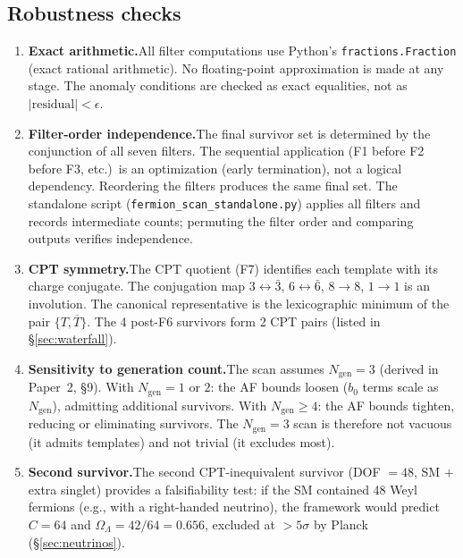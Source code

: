 \documentclass[11pt,a4paper]{article}
\theoremstyle{definition}
\begin{document}
\subsection{Robustness checks}
\label{app:robustness}

\begin{enumerate}[nosep]
\item \textbf{Exact arithmetic.}\quad All filter computations use
Python's \texttt{fractions.Fraction} (exact rational arithmetic).  No
floating-point approximation is made at any stage.  The anomaly
conditions are checked as exact equalities, not as
$|\text{residual}| < \epsilon$.

\item \textbf{Filter-order independence.}\quad The final survivor set
is determined by the conjunction of all seven filters.  The sequential
application (F1 before F2 before F3, etc.)\ is an optimization
(early termination), not a logical dependency.  Reordering the filters
produces the same final set.  The standalone script
(\texttt{fermion\_scan\_standalone.py}) applies all filters and records
intermediate counts; permuting the filter order and comparing outputs
verifies independence.

\item \textbf{CPT symmetry.}\quad The CPT quotient (F7) identifies
each template with its charge conjugate.  The conjugation map
$3 \leftrightarrow \bar{3}$, $6 \leftrightarrow \bar{6}$,
$8 \to 8$, $1 \to 1$ is an involution.  The canonical representative
is the lexicographic minimum of the pair $\{T, \overline{T}\}$.  The
4 post-F6 survivors form 2 CPT pairs (listed in \S\ref{sec:waterfall}).

\item \textbf{Sensitivity to generation count.}\quad The scan assumes
$N_{\mathrm{gen}} = 3$ (derived in Paper~2, \S9).  With
$N_{\mathrm{gen}} = 1$ or $2$: the AF bounds loosen ($b_0$ terms
scale as $N_{\mathrm{gen}}$), admitting additional survivors.  With
$N_{\mathrm{gen}} \ge 4$: the AF bounds tighten, reducing or
eliminating survivors.  The $N_{\mathrm{gen}} = 3$ scan is therefore
not vacuous (it admits templates) and not trivial (it excludes most).

\item \textbf{Second survivor.}\quad The second CPT-inequivalent
survivor (DOF $= 48$, SM $+$ extra singlet) provides a
falsifiability test: if the SM contained 48 Weyl fermions (e.g., with
a right-handed neutrino), the framework would predict $C = 64$ and
$\Omega_\Lambda = 42/64 = 0.656$, excluded at $> 5\sigma$ by Planck
(\S\ref{sec:neutrinos}).
\end{enumerate}
\end{document}
